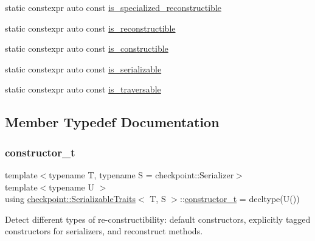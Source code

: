 \begin{DoxyCompactItemize}
static constexpr auto const \hyperlink{structcheckpoint_1_1_serializable_traits_a305317a4e8fb44498f195a39bf59ad2d}{is\+\_\+specialized\+\_\+reconstructible}
\item 
static constexpr auto const \hyperlink{structcheckpoint_1_1_serializable_traits_a6cc78a7cc9b4645727c92437619fce83}{is\+\_\+reconstructible}
\item 
static constexpr auto const \hyperlink{structcheckpoint_1_1_serializable_traits_a7720e2f57d1b3d2f87fd022b47d0b775}{is\+\_\+constructible}
\item 
static constexpr auto const \hyperlink{structcheckpoint_1_1_serializable_traits_a3941c4fcb5397fe564a3453857aa9183}{is\+\_\+serializable}
\item 
static constexpr auto const \hyperlink{structcheckpoint_1_1_serializable_traits_a426639501cd0ce23cb14c7b2ff982fc1}{is\+\_\+traversable}
\end{DoxyCompactItemize}


\subsection{Member Typedef Documentation}
\mbox{\label{structcheckpoint_1_1_serializable_traits_aa0430155930461d346b90681db234d84}} 
\subsubsection{\texorpdfstring{constructor\+\_\+t}{constructor\_t}}
{\footnotesize\ttfamily template$<$typename T, typename S = checkpoint\+::\+Serializer$>$ \\
template$<$typename U $>$ \\
using \hyperlink{structcheckpoint_1_1_serializable_traits}{checkpoint\+::\+Serializable\+Traits}$<$ T, S $>$\+::\hyperlink{structcheckpoint_1_1_serializable_traits_aa0430155930461d346b90681db234d84}{constructor\+\_\+t} =  decltype(U())}

Detect different types of re-\/constructibility\+: default constructors, explicitly tagged constructors for serializers, and reconstruct methods. \mbox{\label{structcheckpoint_1_1_serializable_traits_a8e42305be1264b105f525ae7dff36c15}} 
